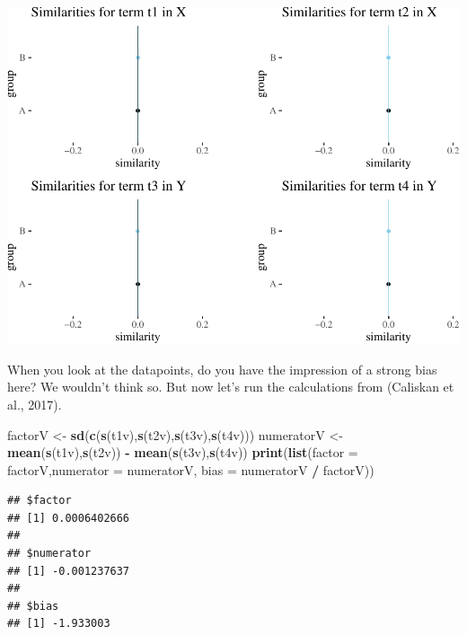 \documentclass[10pt,dvipsnames,enabledeprecatedfontcommands]{scrartcl}
\newenvironment{Shaded}{\begin{snugshade}}{\end{snugshade}}
\newcommand{\KeywordTok}[1]{\textcolor[rgb]{0.13,0.29,0.53}{\textbf{#1}}}
\newcommand{\DataTypeTok}[1]{\textcolor[rgb]{0.13,0.29,0.53}{#1}}
\newcommand{\StringTok}[1]{\textcolor[rgb]{0.31,0.60,0.02}{#1}}
\newcommand{\OperatorTok}[1]{\textcolor[rgb]{0.81,0.36,0.00}{\textbf{#1}}}
\newcommand{\NormalTok}[1]{#1}
\begin{document}
\normalsize

\begin{center}\includegraphics[width=1\linewidth]{paperDraft_files/figure-latex/unnamed-chunk-6-1} \end{center}

\noindent When you look at the datapoints, do you have the impression of
a strong bias here? We wouldn't think so. But now let's run the
calculations from (Caliskan et al., 2017).

\vspace{1mm} \footnotesize

\begin{Shaded}
\begin{Highlighting}[]
\NormalTok{factorV <-}\StringTok{ }\KeywordTok{sd}\NormalTok{(}\KeywordTok{c}\NormalTok{(}\KeywordTok{s}\NormalTok{(t1v),}\KeywordTok{s}\NormalTok{(t2v),}\KeywordTok{s}\NormalTok{(t3v),}\KeywordTok{s}\NormalTok{(t4v)))}
\NormalTok{numeratorV <-}\StringTok{  }\KeywordTok{mean}\NormalTok{(}\KeywordTok{s}\NormalTok{(t1v),}\KeywordTok{s}\NormalTok{(t2v)) }\OperatorTok{-}\StringTok{ }\KeywordTok{mean}\NormalTok{(}\KeywordTok{s}\NormalTok{(t3v),}\KeywordTok{s}\NormalTok{(t4v))}
\KeywordTok{print}\NormalTok{(}\KeywordTok{list}\NormalTok{(}\DataTypeTok{factor =}\NormalTok{ factorV,}\DataTypeTok{numerator =}\NormalTok{ numeratorV, }\DataTypeTok{bias =}\NormalTok{ numeratorV }\OperatorTok{/}\StringTok{ }\NormalTok{factorV))}
\end{Highlighting}
\end{Shaded}

\begin{verbatim}
## $factor
## [1] 0.0006402666
## 
## $numerator
## [1] -0.001237637
## 
## $bias
## [1] -1.933003
\end{verbatim}
\end{document}
